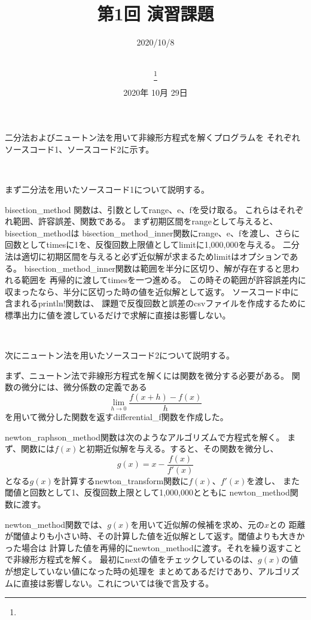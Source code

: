 \documentclass[uplatex, 11pt,a4j, titlepage]{jsarticle}
\title{第1回 演習課題}
\date{2020年 10月 29日}
\author{
    \small{\myid} \\
    \myname\thanks{\mymail}
}
\begin{document}
\maketitle


\subtitle{2020/10/8}


二分法およびニュートン法を用いて非線形方程式を解くプログラムを
それぞれソースコード1、ソースコード2に示す。

\ 

まず二分法を用いたソースコード1について説明する。

bisection\_method 関数は、引数としてrange、e、fを受け取る。
これらはそれぞれ範囲、許容誤差、関数である。
まず初期区間をrangeとして与えると、bisection\_methodは
bisection\_method\_inner関数にrange、e、fを渡し、さらに
回数としてtimesに1を、反復回数上限値としてlimitに1,000,000を与える。
二分法は適切に初期区間を与えると必ず近似解が求まるためlimitはオプションである。
bisection\_method\_inner関数は範囲を半分に区切り、解が存在すると思われる範囲を
再帰的に渡してtimesを一つ進める。
この時その範囲が許容誤差内に収まったなら、半分に区切った時の値を近似解として返す。
ソースコード中に含まれるprintln!関数は、
課題で反復回数と誤差のcsvファイルを作成するために
標準出力に値を渡しているだけで求解に直接は影響しない。

\ 

次にニュートン法を用いたソースコード2について説明する。

まず、ニュートン法で非線形方程式を解くには関数を微分する必要がある。
関数の微分には、微分係数の定義である
\begin{equation}
    \lim_{h \to 0} \frac{f(x + h) - f(x)}{h}   
\end{equation}
を用いて微分した関数を返すdifferential\_f関数を作成した。

newton\_raphson\_method関数は次のようなアルゴリズムで方程式を解く。
まず、関数には$f(x)$と初期近似解を与える。すると、その関数を微分し、
\begin{equation}
    g(x) = x - \frac{f(x)}{f'(x)}
\end{equation}
となる$g(x)$を計算するnewton\_transform関数に$f(x)$、$f'(x)$を渡し、
また閾値と回数として1、反復回数上限として1,000,000とともに
newton\_method関数に渡す。

newton\_method関数では、$g(x)$を用いて近似解の候補を求め、元の$x$との
距離が閾値よりも小さい時、その計算した値を近似解として返す。閾値よりも大きかった場合は
計算した値を再帰的にnewton\_methodに渡す。それを繰り返すことで非線形方程式を解く。
最初にnextの値をチェックしているのは、$g(x)$の値が想定していない値になった時の処理を
まとめてあるだけであり、アルゴリズムに直接は影響しない。これについては後で言及する。
\end{document}
